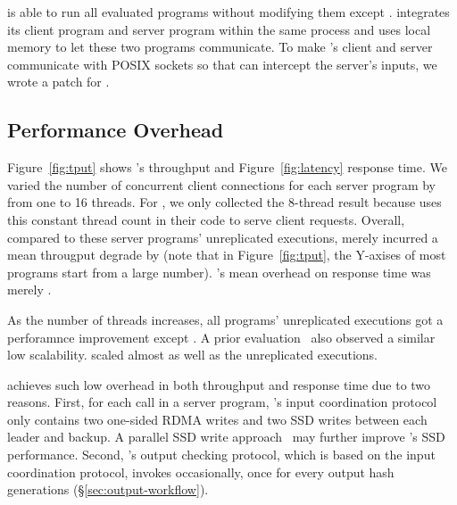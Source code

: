 \xxx is able to run all \nprog evaluated programs without modifying them except 
\calvin. \calvin integrates its client program and server program within the 
same process and uses local memory to let these two programs communicate. To 
make \calvin's client and server communicate with POSIX sockets so that \xxx 
can intercept the server's inputs, we wrote a \nlinescalvin patch for \calvin.

\subsection{Performance Overhead} \label{sec:overhead}

Figure~\ref{fig:tput} shows \xxx's throughput and Figure~\ref{fig:latency} 
response time. We varied the number of concurrent client connections for each 
server program by from one to 16 threads. For \calvin, we only collected the 
8-thread result because \calvin uses this constant thread count in their code 
to serve client requests. Overall, compared to these server programs' 
unreplicated executions, \xxx merely incurred a mean througput degrade by 
\tputoverhead (note that in Figure~\ref{fig:tput}, the Y-axises of most programs 
start from a large number). \xxx's mean overhead on response time was merely 
\latencyoverhead.

As the number of threads increases, all programs' unreplicated executions 
got a perforamnce improvement except \memcached. A prior 
evaluation~\cite{rex:eurosys14} also observed a similar \memcached low 
scalability. \xxx scaled almost as well as the unreplicated executions.

\xxx achieves such low overhead in both throughput and response time due to two 
reasons. First, for each \recv call in a server program, \xxx's input 
coordination protocol only contains two one-sided RDMA writes and two SSD writes 
between each leader and backup. A parallel SSD write 
approach~\cite{alysson:atc13} may further improve \xxx's SSD performance.  
Second, \xxx's output checking protocol, which is based on the input 
coordination protocol, invokes occasionally, once for every \thashcomp output 
hash generations (\S\ref{sec:output-workflow}).

